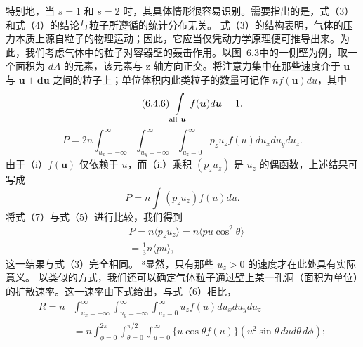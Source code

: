特别地，当 \(s=1\) 和 \(s=2\) 时，其具体情形很容易识别。需要指出的是，式（3）和式（4）的结论与粒子所遵循的统计分布无关。
式（3）的结构表明，气体的压力本质上源自粒子的物理运动；因此，它应当仅凭动力学原理便可推导出来。为此，我们考虑气体中的粒子对容器壁的轰击作用。以图~6.3中的一侧壁为例，取一个面积为 \(dA\) 的元素，该元素与 z 轴方向正交。将注意力集中在那些速度介于 \(\boldsymbol{u}\) 与 \(\boldsymbol{u}+\boldsymbol{du}\) 之间的粒子上；单位体积内此类粒子的数量可记作 \(nf(\boldsymbol{u})du\)，其中
\begin{equation}\tag{6.4.6}\label{eq:6.4.6}
\intop_{\mathrm{all~}\boldsymbol{u}}f(\boldsymbol{u})d\boldsymbol{u}=1.
\end{equation}
\begin{equation}\tag{6.4.7}\label{eq:6.4.7}
P = 2 n  \int _ { u _ { x } = - \infty } ^{\infty} \int _ { u _ { y } = - \infty } ^{\infty} \int _ { u _ { z } = 0 } ^{\infty} p _ { z } u _ { z } f ( u ) d u _ { x } d u _ { y } d u _ { z } .
\end{equation}
由于（i）\(f(\boldsymbol{u})\) 仅依赖于 \(u\)，而（ii）乘积 \((p_{z}u_{z})\) 是 \(u_{z}\) 的偶函数，上述结果可写成
\begin{equation}\tag{6.4.8}\label{eq:6.4.8}
P = n \int \left( p _ { z } u _ { z } \right) f ( u ) d u .
\end{equation}
将式（7）与式（5）进行比较，我们得到
\begin{equation}\tag{6.4.9}\label{eq:6.4.9}
\begin{array}{rl} & { P = n \langle p _ { z } u _ { z } \rangle = n \langle p u \cos ^{2} \theta \rangle } \\& { = \frac { 1 } { 3 } n \langle p u \rangle , } \end{array}
\end{equation}
这一结果与式（3）完全相同。
³显然，只有那些 \(u_{z} > 0\) 的速度才在此处具有实际意义。
以类似的方式，我们还可以确定气体粒子通过壁上某一孔洞（面积为单位）的扩散速率。这一速率由下式给出，与式（6）相比，
\begin{equation}\tag{6.4.10}\label{eq:6.4.10}
\begin{array}{rl} { R = n } & { \int _ { u _ { x } = - \infty } ^{\infty} \int _ { u _ { y } = - \infty } ^{\infty} \int _ { u _ { z } = 0 } ^{\infty} u _ { z } f ( u ) d u _ { x } d u _ { y } d u _ { z } } \\& { = n \int _ { \phi = 0 } ^{2 \pi} \int _ { \theta = 0 } ^{\pi / 2} \int _ { u = 0 } ^{\infty} \{ u \cos \theta f ( u ) \} ( u ^{2} \sin \theta \, d u d \theta \, d \phi ) ; } \end{array}
\end{equation}
